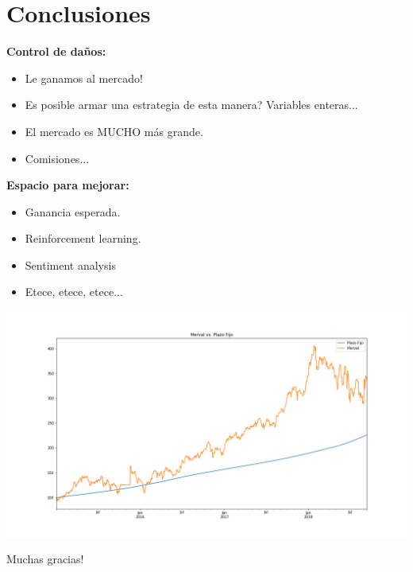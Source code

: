 \documentclass[12pt,aspectratio=169]{beamer}
\begin{document}
\section{Conclusiones}
\begin{frame}
\textbf{Control de daños:}

\begin{itemize}
\item Le ganamos al mercado!
\item Es posible armar una estrategia de esta manera? Variables enteras...
\item El mercado es MUCHO más grande.
\item Comisiones...
\end{itemize}

\textbf{Espacio para mejorar:}

\begin{itemize}
\item Ganancia esperada.
\item Reinforcement learning.
\item Sentiment analysis
\item Etece, etece, etece...
\end{itemize}
\end{frame}

\begin{frame}
\centering
\includegraphics[height=.9\paperheight]{plazofijovsmerval.png}
\end{frame}

\begin{frame}
\huge Muchas gracias!
\end{frame}
\end{document}
